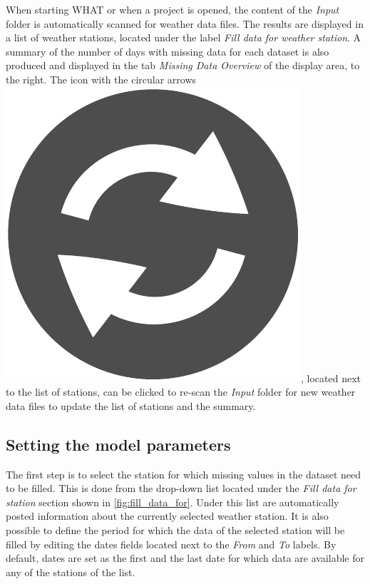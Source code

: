 \documentclass[WHATMANUAL.tex]{subfiles}
\begin{document}
When starting WHAT or when a project is opened, the content of the \emph{Input} folder is automatically scanned for weather data files. The results are displayed in a list of weather stations, located under the label \emph{Fill data for weather station}. A summary of the number of days with missing data for each dataset is also produced and displayed in the tab \emph{Missing Data Overview} of the display area, to the right. The icon with the circular arrows~{\includegraphics[height=2ex]{img/refresh2}}, located next to the list of stations, can be clicked to re-scan the \emph{Input} folder for new weather data files to update the list of stations and the summary. 

\begin{figure}[!ht]
    \setlength{\fboxsep}{0pt}
    {
    }
\end{figure}

\subsection{Setting the model parameters}

The first step is to select the station for which missing values in the dataset need to be filled. This is done from the drop-down list located under the \emph{Fill data for station} section shown in \cref{fig:fill_data_for}. Under this list are automatically posted information about the currently selected weather station. It is also possible to define the period for which the data of the selected station will be filled by editing the dates fields located next to the \emph{From} and \emph{To} labels. By default, dates are set as the first and the last date for which data are available for any of the stations of the list.
\end{document}
